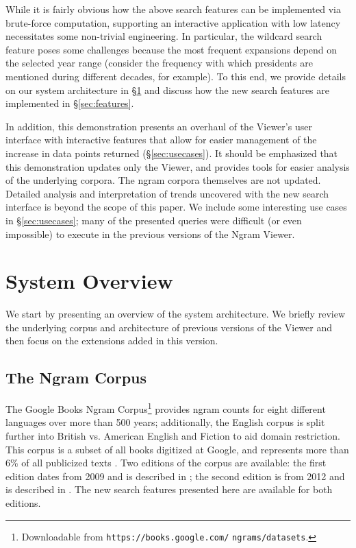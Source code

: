 \documentclass[11pt,a4paper]{article}
\newcommand{\eat}[1]{\ignorespaces}
\begin{document}
While it is fairly obvious how the above search features can be implemented via brute-force computation, supporting an interactive application with low latency necessitates some non-trivial engineering. In particular, the wildcard search feature poses some challenges because the most frequent expansions depend on the selected year range (consider the frequency with which presidents are mentioned during different decades, for example). To this end, we provide details on our system architecture in \S\ref{sec:overview}  and discuss how the new search features are implemented in \S\ref{sec:features}.

In addition, this demonstration presents an overhaul of the Viewer's user interface with interactive features that allow for easier management of the increase in data points returned (\S\ref{sec:usecases}). \eat{For example, to normalize for morphological inflections or casing, the frequencies of multiple ngrams can be aggregated via a (right) mouse-click. Additionally, lines can be highlighted or faded (via hovering or mouse-clicks) to focus on particular ngrams and make trends more apparent.} It should be emphasized that this demonstration updates only the Viewer, and provides tools for easier analysis of the underlying corpora. The ngram corpora themselves are not updated.
Detailed analysis and interpretation of trends uncovered with the new search interface is beyond the scope of this paper. We include some interesting use cases in \S\ref{sec:usecases}; many of the presented queries were difficult (or even impossible) to execute in the previous versions of the Ngram Viewer.

\section{System Overview}
\label{sec:overview}

We start by presenting an overview of the system architecture. We briefly review the underlying corpus and architecture of previous versions of the Viewer \cite{culturomics,lin2012syntactic} and then focus on the extensions added in this version.


\subsection{The Ngram Corpus}
	The Google Books Ngram Corpus\footnote{Downloadable from \texttt{https://books.google.com/} \texttt{ngrams/datasets}.} provides ngram counts for eight different languages over more than 500 years; additionally, the English corpus is split further into British vs. American English and Fiction to aid domain restriction. This corpus is a subset of all books digitized at Google, and represents more than 6\% of all publicized texts \cite{lin2012syntactic}. Two editions of the corpus are available: the first edition dates from 2009 and is described in ; the second edition is from 2012 and is described in . The new search features presented here are available for both editions.
\end{document}
